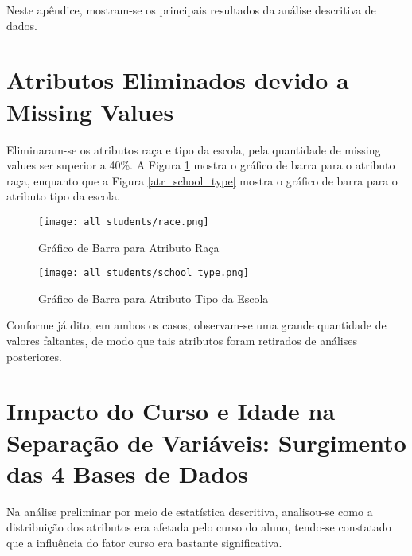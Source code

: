 Neste apêndice, mostram-se os principais resultados da análise descritiva de dados. 

\section{Atributos Eliminados devido a Missing Values} \label{graf_miss_value}
\par Eliminaram-se os atributos raça e tipo da escola, pela quantidade de missing
values ser superior a 40\%.  A Figura \ref{atr_race} mostra o gráfico de barra para o
atributo raça, enquanto que a Figura \ref{atr_school_type} mostra o gráfico de barra
para o atributo tipo da escola.  
    \begin{figure}[!ht]
        \caption{Gráfico de Barra para Atributo Raça}
        \centering
        \texttt{[image: all\_students/race.png]}
        \label{atr_race}
    \end{figure}

    \begin{figure}[!ht]
        \caption{Gráfico de Barra para Atributo Tipo da Escola}
        \centering
        \texttt{[image: all\_students/school\_type.png]}
        \label{atr_school}
    \end{figure}

Conforme já dito, em ambos os casos, observam-se uma grande quantidade de valores
faltantes, de modo que tais atributos foram retirados de análises posteriores. 

\section{Impacto do Curso e Idade na Separação de Variáveis: Surgimento das 4 Bases
de Dados} \label{justificativa_4_base_dados}
Na análise preliminar por meio de estatística descritiva, analisou-se como a
distribuição dos atributos era afetada pelo curso do aluno, tendo-se constatado que a
influência do fator curso era bastante significativa. 


